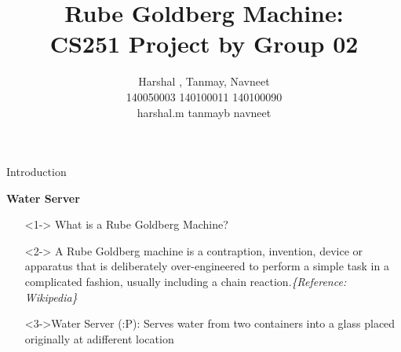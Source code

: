 \documentclass{beamer}
\title{Rube Goldberg Machine: \\CS251 Project by Group 02}
\author{Harshal ,  Tanmay, \quad Navneet\\140050003  140100011  140100090\\ harshal.m \quad  tanmayb \quad navneet}
\institute{IIT Bombay}
\begin{document}
\maketitle
\begin{frame}{Introduction}
\begin{center}
\textbf{\Large{Water Server}}
\end{center}
\begin{itemize}[label = {}]
\item[]<1-> What is a Rube Goldberg Machine?
\item[]<2-> A Rube Goldberg machine is a contraption, invention, device or apparatus that is deliberately over-engineered to perform a simple task in a complicated fashion, usually including a chain reaction.\textit{\tiny{\{Reference: Wikipedia\}}}
\item[]<3->Water Server (:P): Serves water from two containers into a glass placed originally at adifferent location
\end{itemize}
\end{frame}
\end{document}

